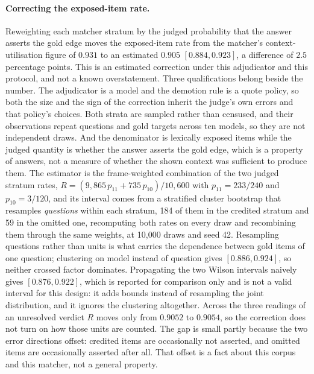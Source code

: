 \documentclass[10pt,twocolumn]{article}
\begin{document}
\paragraph{Correcting the exposed-item rate.} Reweighting each matcher stratum by the judged probability that the answer asserts the gold edge moves the exposed-item rate from the matcher's context-utilisation figure of $0.931$ to an estimated $\mathbf{0.905}$ $[0.884,0.923]$, a difference of $2.5$ percentage points. This is an estimated correction under this adjudicator and this protocol, and not a known overstatement. Three qualifications belong beside the number. The adjudicator is a model and the demotion rule is a quote policy, so both the size and the sign of the correction inherit the judge's own errors and that policy's choices. Both strata are sampled rather than censused, and their observations repeat questions and gold targets across ten models, so they are not independent draws. And the denominator is lexically exposed items while the judged quantity is whether the answer asserts the gold edge, which is a property of answers, not a measure of whether the shown context was sufficient to produce them. The estimator is the frame-weighted combination of the two judged stratum rates, $R=(9{,}865\,p_{11}+735\,p_{10})/10{,}600$ with $p_{11}=233/240$ and $p_{10}=3/120$, and its interval comes from a stratified cluster bootstrap that resamples \emph{questions} within each stratum, 184 of them in the credited stratum and 59 in the omitted one, recomputing both rates on every draw and recombining them through the same weights, at 10{,}000 draws and seed 42. Resampling questions rather than units is what carries the dependence between gold items of one question; clustering on model instead of question gives $[0.886,0.924]$, so neither crossed factor dominates. Propagating the two Wilson intervals naively gives $[0.876,0.922]$, which is reported for comparison only and is not a valid interval for this design: it adds bounds instead of resampling the joint distribution, and it ignores the clustering altogether. Across the three readings of an unresolved verdict $R$ moves only from $0.9052$ to $0.9054$, so the correction does not turn on how those units are counted. The gap is small partly because the two error directions offset: credited items are occasionally not asserted, and omitted items are occasionally asserted after all. That offset is a fact about this corpus and this matcher, not a general property.
\end{document}
